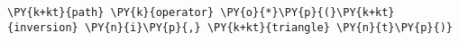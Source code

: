 \begin{Verbatim}[commandchars=\\\{\}]
    \PY{k+kt}{path} \PY{k}{operator} \PY{o}{*}\PY{p}{(}\PY{k+kt}{inversion} \PY{n}{i}\PY{p}{,} \PY{k+kt}{triangle} \PY{n}{t}\PY{p}{)}
\end{Verbatim}
